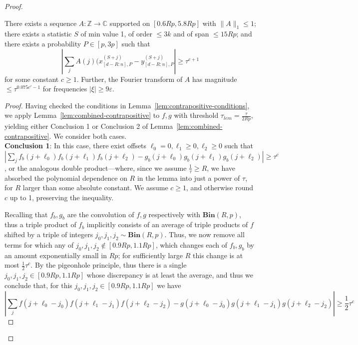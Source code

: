 \documentclass[11pt]{article}
\theoremstyle{plain}
\newcommand{\Bin}[2]{\textbf{Bin}(#1,#2)}
\newcommand{\abs}[1]{\left|#1\right|}
\newcommand{\eps}{\varepsilon}
\begin{document}
\begin{proof}
\begin{lemma}
    \label{lem:coefficients-helper}
    There exists a sequence $A: \mathbb{Z} \rightarrow \mathbb{C}$ supported on $[0.6Rp,5.8Rp]$ with $\|A\|_1 \leq 1$; there exists a statistic $S$ of min value 1, of order $\leq 3k$ and of span $\leq 15Rp$; and there exists a probability $P \in [p,3p]$ such that 
    \begin{equation}\label{eq:combined-discrepancy-bound}
        \abs{\sum_j A(j) (x^{(S+j)}_{[d-R:n],P} - y^{(S+j)}_{[d-R:n],P}} \geq \tau^{c+1}
    \end{equation}
    for some constant $c \geq 1$. Further, the Fourier transform of $A$ has magnitude $\leq \tau^{0.075c'-1}$ for frequencies $|\xi| \geq 9\eps$. 
\end{lemma}
\begin{proof}
    Having checked the conditions in Lemma~\ref{lem:contrapositive-conditions}, we apply Lemma~\ref{lem:combined-contrapositive} to $f,g$ with threshold $\tau_{lem}=\frac{\tau}{2Rp}$, yielding either Conclusion 1 or Conclusion 2 of Lemma~\ref{lem:combined-contrapositive}. We consider both cases. \\
    
    \noindent \textbf{Conclusion 1}: In this case, there exist offsets $\ell_0=0,\ell_1\geq 0,\ell_2\geq 0$ such that $|\sum_j f_b(j+\ell_0)f_b(j+\ell_1)f_b(j+\ell_2)-g_b(j+\ell_0)g_b(j+\ell_1)g_b(j+\ell_2)|\geq \tau^c$, or the analogous double product---where, since we assume $\frac{1}{\tau}\geq R$, we have absorbed the polynomial dependence on $R$ in the lemma into just a power of $\tau$, for $R$ larger than some absolute constant. We assume $c\geq 1$, and otherwise round $c$ up to 1, preserving the inequality. 

    Recalling that $f_b,g_b$ are the convolution of $f,g$ respectively with $\Bin{R}{p}$, thus a triple product of $f_b$ implicitly consists of an average of triple products of $f$ shifted by a triple of integers $j_0,j_1,j_2\sim \Bin{R}{p}$. Thus, we now remove all terms for which any of $j_0,j_1,j_2\notin [0.9Rp,1.1Rp]$, which changes each of $f_b,g_b$ by an amount exponentially small in $Rp$; for sufficiently large $R$ this change is at most $\frac{1}{2}\tau^c$. By the pigeonhole principle, thus there is a single $j_0,j_1,j_2\in [0.9Rp,1.1Rp]$ whose discrepancy is at least the average, and thus we conclude that, for this $j_0,j_1,j_2\in [0.9Rp,1.1Rp]$ we have \begin{equation}\label{eq:triple-bound}|\sum_j f(j+\ell_0-j_0)f(j+\ell_1-j_1)f(j+\ell_2-j_2)-g(j+\ell_0-j_0)g(j+\ell_1-j_1)g(j+\ell_2-j_2)|\geq \frac{1}{2}\tau^c\end{equation}


\end{proof}
\end{proof}
\end{document}
